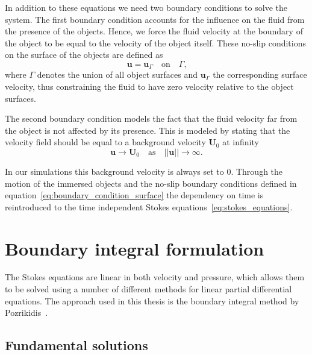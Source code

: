 In addition to these equations we need two boundary conditions to solve the system. The first boundary condition accounts for the influence on the fluid from the presence of the objects. Hence, we force the fluid velocity at the boundary of the object to be equal to the velocity of the object itself. These no-slip conditions on the surface of the objects are defined as
\begin{equation}
  \label{eq:boundary_condition_surface}
  \mathbf{u} = \mathbf{u}_\Gamma  \quad \text{on} \quad  \Gamma \text{,}
\end{equation}
where $\Gamma$ denotes the union of all object surfaces and $\mathbf{u}_\Gamma$ the corresponding surface velocity, thus constraining the fluid to have zero velocity relative to the object surfaces.

The second boundary condition models the fact that the fluid velocity far from the object is not affected by its presence. This is modeled by stating that the velocity field should be equal to a background velocity $\mathbf{U}_0$ at infinity
\begin{equation}
  \label{eq:boundary_condition_background}
  \mathbf{u} \rightarrow \mathbf{U}_0 \quad \text{as} \quad ||\mathbf{u}|| \rightarrow \infty \text{.}
\end{equation}

In our simulations this background velocity is always set to $0$. Through the motion of the immersed objects and the no-slip boundary conditions defined in equation~\eqref{eq:boundary_condition_surface} the dependency on time is reintroduced to the time independent Stokes equations~\eqref{eq:stokes_equations}.

\section{Boundary integral formulation}
\label{sec:boundary_integral_formulation}

The Stokes equations are linear in both velocity and pressure, which allows them to be solved using a number of different methods for linear partial differential equations. The approach used in this thesis is the boundary integral method by Pozrikidis~\cite{Pozrikidis1992}.

\subsection{Fundamental solutions}
\label{subsec:fundamental_solutions}

